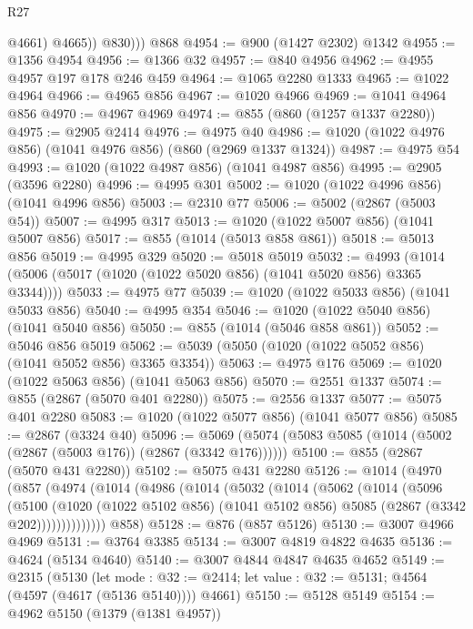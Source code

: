 \begin{lexlean}{R27}
\begin{coremodule}
              @4661)
            @4665))
          @830)))
    @868
@4954 := @900 (@1427 @2302) @1342
@4955 := @1356 @4954
@4956 := @1366 @32
@4957 := @840 @4956
@4962 := @4955 @4957 @197 @178 @246 @459
@4964 := @1065 @2280 @1333
@4965 := @1022 @4964
@4966 := @4965 @856
@4967 := @1020 @4966
@4969 := @1041 @4964 @856
@4970 := @4967 @4969
@4974 := @855 (@860 (@1257 @1337 @2280))
@4975 := @2905 @2414
@4976 := @4975 @40
@4986 := @1020 (@1022 @4976 @856) (@1041 @4976 @856) (@860 (@2969 @1337 @1324))
@4987 := @4975 @54
@4993 := @1020 (@1022 @4987 @856) (@1041 @4987 @856)
@4995 := @2905 (@3596 @2280)
@4996 := @4995 @301
@5002 := @1020 (@1022 @4996 @856) (@1041 @4996 @856)
@5003 := @2310 @77
@5006 := @5002 (@2867 (@5003 @54))
@5007 := @4995 @317
@5013 := @1020 (@1022 @5007 @856) (@1041 @5007 @856)
@5017 := @855 (@1014 (@5013 @858 @861))
@5018 := @5013 @856
@5019 := @4995 @329
@5020 := @5018 @5019
@5032 := @4993 (@1014 (@5006 (@5017 (@1020 (@1022 @5020 @856) (@1041 @5020 @856) @3365 @3344))))
@5033 := @4975 @77
@5039 := @1020 (@1022 @5033 @856) (@1041 @5033 @856)
@5040 := @4995 @354
@5046 := @1020 (@1022 @5040 @856) (@1041 @5040 @856)
@5050 := @855 (@1014 (@5046 @858 @861))
@5052 := @5046 @856 @5019
@5062 := @5039 (@5050 (@1020 (@1022 @5052 @856) (@1041 @5052 @856) @3365 @3354))
@5063 := @4975 @176
@5069 := @1020 (@1022 @5063 @856) (@1041 @5063 @856)
@5070 := @2551 @1337
@5074 := @855 (@2867 (@5070 @401 @2280))
@5075 := @2556 @1337
@5077 := @5075 @401 @2280
@5083 := @1020 (@1022 @5077 @856) (@1041 @5077 @856)
@5085 := @2867 (@3324 @40)
@5096 := @5069 (@5074 (@5083 @5085 (@1014 (@5002 (@2867 (@5003 @176)) (@2867 (@3342 @176))))))
@5100 := @855 (@2867 (@5070 @431 @2280))
@5102 := @5075 @431 @2280
@5126 := @1014
    (@4970
      (@857
        (@4974
          (@1014
            (@4986
              (@1014
                (@5032
                  (@1014
                    (@5062
                      (@1014
                        (@5096
                          (@5100
                            (@1020
                              (@1022 @5102 @856)
                              (@1041 @5102 @856)
                              @5085
                              (@2867 (@3342 @202))))))))))))))
      @858)
@5128 := @876 (@857 @5126)
@5130 := @3007 @4966 @4969
@5131 := @3764 @3385
@5134 := @3007 @4819 @4822 @4635
@5136 := @4624 (@5134 @4640)
@5140 := @3007 @4844 @4847 @4635 @4652
@5149 := @2315
    (@5130
      (let mode : @32 := @2414; let value : @32 := @5131; @4564 (@4597 (@4617 (@5136 @5140))))
      @4661)
@5150 := @5128 @5149
@5154 := @4962 @5150 (@1379 (@1381 @4957))

\end{coremodule}
\end{lexlean}
